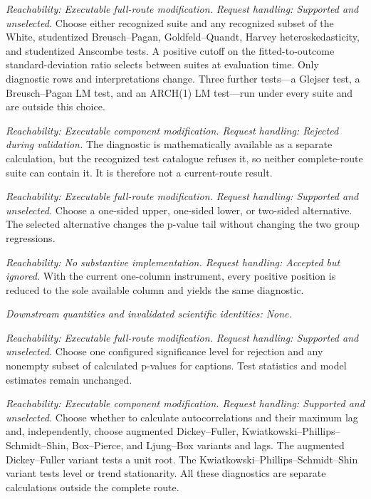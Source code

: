 \documentclass[11pt]{article}
\begin{document}
\begin{description}[style=nextline]
\item[Heteroskedasticity diagnostic suites.]
\emph{Reachability: Executable full-route modification. Request handling: Supported and unselected.}
Choose either recognized suite and any recognized subset of the White, studentized Breusch--Pagan,
Goldfeld--Quandt, Harvey heteroskedasticity, and studentized Anscombe tests. A positive cutoff on the fitted-to-outcome standard-deviation ratio selects between
suites at evaluation time. Only diagnostic rows and interpretations change. Three further tests---a
Glejser test, a Breusch--Pagan LM test, and an ARCH(1) LM test---run under every suite and are outside this choice.

\item[Cook--Weisberg diagnostic.]
\emph{Reachability: Executable component modification. Request handling: Rejected during validation.}
The diagnostic is mathematically available as a separate calculation, but the recognized test
catalogue refuses it, so neither complete-route suite can contain it. It is therefore not a
current-route result.

\item[Goldfeld--Quandt alternative.]
\emph{Reachability: Executable full-route modification. Request handling: Supported and unselected.}
Choose a one-sided upper, one-sided lower, or two-sided alternative. The selected alternative
changes the p-value tail without changing the two group regressions.

\item[Goldfeld--Quandt deflator position.]
\emph{Reachability: No substantive implementation. Request handling: Accepted but ignored.}
With the current one-column instrument, every positive position is reduced to the sole available
column and yields the same diagnostic.

\emph{Downstream quantities and invalidated scientific identities: None.}

\item[Diagnostic rejection and caption sets.]
\emph{Reachability: Executable full-route modification. Request handling: Supported and unselected.}
Choose one configured significance level for rejection and any nonempty subset of calculated
p-values for captions. Test statistics and model estimates remain unchanged.

\item[Standalone time-series diagnostics.]
\emph{Reachability: Executable component modification. Request handling: Supported and unselected.}
Choose whether to calculate autocorrelations and their maximum lag and, independently, choose
augmented Dickey--Fuller, Kwiatkowski--Phillips--Schmidt--Shin, Box--Pierce, and Ljung--Box variants
and lags. The augmented Dickey--Fuller variant tests a unit root. The
Kwiatkowski--Phillips--Schmidt--Shin variant tests level or trend stationarity. All these
diagnostics are separate calculations outside the complete route.


\end{description}
\end{document}

